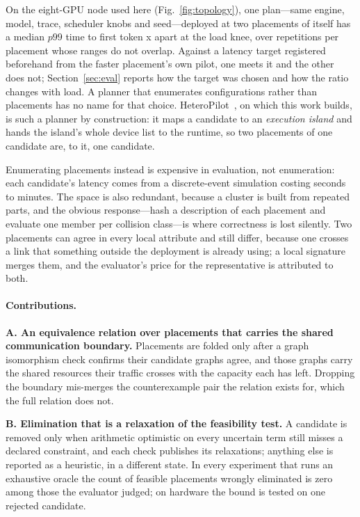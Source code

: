 On the eight-GPU node used here (Fig.~\ref{fig:topology}), one plan---same engine, model, trace,
scheduler knobs and seed---deployed at two placements of itself has a median
$p99$ time to first token \egfiveTtwoOverTone{}x apart at the load knee, over
\egfiveReps{} repetitions per placement whose ranges do not overlap. Against a
latency target registered beforehand from the faster placement's own pilot, one
meets it and the other does not; Section~\ref{sec:eval} reports how the target
was chosen and how the ratio changes with load. A planner that enumerates
configurations rather than placements has no name for that choice.
HeteroPilot~\cite{heteropilot}, on which this work builds, is such a planner by
construction: it maps a candidate to
an \emph{execution island} and hands the island's whole device list to the
runtime, so two placements of one candidate are, to it, one candidate.

Enumerating placements instead is expensive in evaluation, not enumeration:
each candidate's latency comes from a discrete-event simulation costing seconds
to minutes. The space is also redundant, because a cluster is built from
repeated parts, and the obvious response---hash a description of each
placement and evaluate one member per collision class---is where correctness
is lost silently. Two placements can agree in every local attribute and still
differ, because one crosses a link that something outside the deployment is
already using; a local signature merges them, and the evaluator's price for
the representative is attributed to both.

\paragraph{Contributions.}

\textbf{A. An equivalence relation over placements that carries the shared
communication boundary.} Placements are folded only after a graph isomorphism
check confirms their candidate graphs agree, and those graphs carry the shared
resources their traffic crosses with the capacity each has left. Dropping the
boundary mis-merges the counterexample pair the relation exists for, which
the full relation does not.

\textbf{B. Elimination that is a relaxation of the feasibility test.} A
candidate is removed only when arithmetic optimistic on every uncertain term
still misses a declared constraint, and each check publishes its relaxations;
anything else is reported as a heuristic, in a different state. In every
experiment that runs an exhaustive oracle the count of feasible placements
wrongly eliminated is zero among those the evaluator judged; on hardware the
bound is tested on one rejected candidate.

